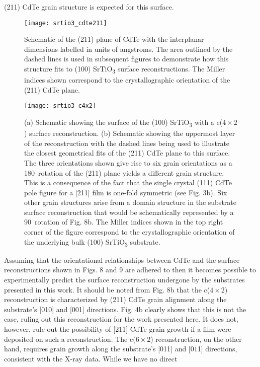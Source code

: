 (211) CdTe grain structure is expected for this surface.
\begin{figure}
    \centering
    \texttt{[image: srtio3\_cdte211]}
    \caption{\label{figLsrtio3_cdte211}Schematic of the (211) plane of CdTe with the interplanar dimensions
        labelled in units of angstroms. The area outlined by the dashed lines is used in
        subsequent figures to demonstrate how this structure fits to (100) SrTiO\textsubscript{3} surface
        reconstructions. The Miller indices shown correspond to the crystallographic
        orientation of the (211) CdTe plane.}
\end{figure}
\begin{figure}
    \centering
    \texttt{[image: srtio3\_c4x2]}
    \caption{\label{fig:srtio3_c4x2}(a) Schematic showing the surface of the (100) SrTiO\textsubscript{3} with a c($4\times2$) surface reconstruction. (b) Schematic showing the uppermost layer of the reconstruction with the dashed lines being used to illustrate the closest geometrical fits of the (211) CdTe plane to this surface. The three orientations shown give rise to six grain orientations as a 180\degree~rotation of the (211) plane yields a different grain structure. This is a consequence of the fact that the single crystal (111) CdTe pole figure for a [211] film is one-fold symmetric (see Fig. 3b). Six other grain structures arise from a domain structure in the substrate surface reconstruction that would be schematically represented by a 90\degree~rotation of Fig. 8b. The Miller indices shown in the top right corner of the figure correspond to the crystallographic orientation of the underlying bulk (100) SrTiO\textsubscript{3} substrate.}
\end{figure}
Assuming that the orientational relationships between CdTe
and the surface reconstructions shown in Figs. 8 and 9 are adhered
to then it becomes possible to experimentally predict the surface
reconstruction undergone by the substrates presented in this
work. It should be noted from Fig. 8b that the c($4\times2$)
reconstruction is characterized by (211) CdTe grain alignment
along the substrate’s [010] and [001] directions. Fig. 4b clearly
shows that this is not the case, ruling out this reconstruction for the
work presented here. It does not, however, rule out the possibility
of [211] CdTe grain growth if a film were deposited on such a
reconstruction. The c($6\times2$) reconstruction, on the other hand,
requires grain growth along the substrate’s [011] and [0$\overline{1}$1]
directions, consistent with the X-ray data. While we have no direct
